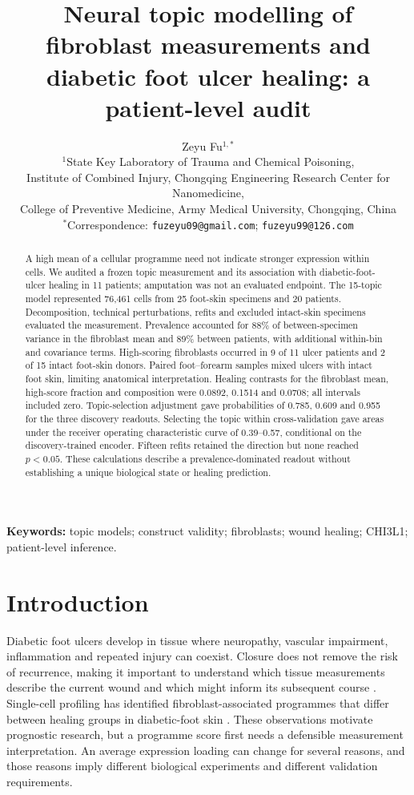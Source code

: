 \documentclass[10pt,a4paper]{article}
\title{Neural topic modelling of fibroblast measurements and diabetic foot ulcer healing: a patient-level audit}
\author{Zeyu Fu$^{1,*}$\\[3pt]\small $^1$State Key Laboratory of Trauma and Chemical Poisoning,\\\small Institute of Combined Injury, Chongqing Engineering Research Center for Nanomedicine,\\\small College of Preventive Medicine, Army Medical University, Chongqing, China\\\small $^*$Correspondence: \texttt{fuzeyu09@gmail.com}; \texttt{fuzeyu99@126.com}}\date{}
\begin{document}
\maketitle
\begin{abstract}
A high mean of a cellular programme need not indicate stronger expression within cells. We audited a frozen topic measurement and its association with diabetic-foot-ulcer healing in 11 patients; amputation was not an evaluated endpoint. The 15-topic model represented 76,461 cells from 25 foot-skin specimens and 20 patients. Decomposition, technical perturbations, refits and excluded intact-skin specimens evaluated the measurement. Prevalence accounted for 88\% of between-specimen variance in the fibroblast mean and 89\% between patients, with additional within-bin and covariance terms. High-scoring fibroblasts occurred in 9 of 11 ulcer patients and 2 of 15 intact foot-skin donors. Paired foot--forearm samples mixed ulcers with intact foot skin, limiting anatomical interpretation. Healing contrasts for the fibroblast mean, high-score fraction and composition were 0.0892, 0.1514 and 0.0708; all intervals included zero. Topic-selection adjustment gave probabilities of 0.785, 0.609 and 0.955 for the three discovery readouts. Selecting the topic within cross-validation gave areas under the receiver operating characteristic curve of 0.39--0.57, conditional on the discovery-trained encoder. Fifteen refits retained the direction but none reached \(p<0.05\). These calculations describe a prevalence-dominated readout without establishing a unique biological state or healing prediction.
\end{abstract}
\noindent\textbf{Keywords:} topic models; construct validity; fibroblasts; wound healing; CHI3L1; patient-level inference.

\section{Introduction}
Diabetic foot ulcers develop in tissue where neuropathy, vascular impairment, inflammation and repeated injury can coexist. Closure does not remove the risk of recurrence, making it important to understand which tissue measurements describe the current wound and which might inform its subsequent course \citep{armstrong2017,wilkinson2020}. Single-cell profiling has identified fibroblast-associated programmes that differ between healing groups in diabetic-foot skin \citep{theocharidis2022,geo_gse165816}. These observations motivate prognostic research, but a programme score first needs a defensible measurement interpretation. An average expression loading can change for several reasons, and those reasons imply different biological experiments and different validation requirements.
\end{document}
